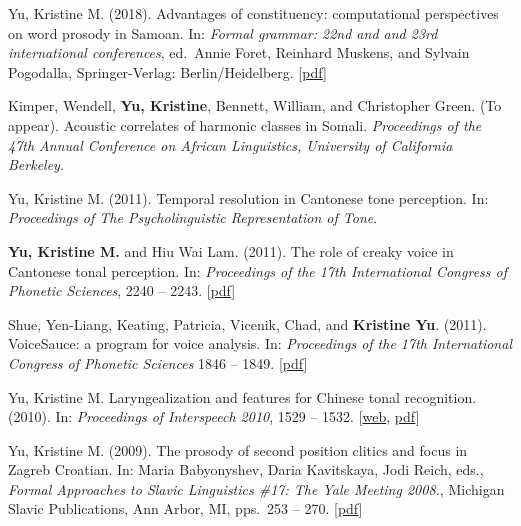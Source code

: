 \documentclass[10pt]{article}
\begin{document}
\begin{bibenum}
  
\item Yu, Kristine M. (2018). Advantages of constituency: computational perspectives on word prosody in Samoan. In: \emph{Formal grammar: 22nd and and 23rd international conferences}, ed.\ Annie Foret, Reinhard Muskens, and Sylvain Pogodalla, Springer-Verlag: Berlin/Heidelberg. [\href{https://github.com/krismyu/smo-constituency-feet/blob/master/fg-kmyu.pdf}{pdf}]

  \item Kimper, Wendell, \textbf{Yu, Kristine}, Bennett, William, and Christopher Green. (To appear). Acoustic correlates of harmonic classes in
    Somali. \emph{Proceedings of the 47th Annual Conference on African Linguistics, University of California Berkeley}.
  
    \item Yu, Kristine M. (2011). Temporal resolution in {C}antonese tone
      perception. In: \emph{Proceedings of The Psycholinguistic Representation of Tone}.

    \item \textbf{Yu, Kristine M.} and Hiu Wai Lam. (2011). The role of creaky
      voice in {C}antonese tonal perception. In: \emph{Proceedings of the
        17th International Congress of Phonetic Sciences},
      2240 -- 2243. [\href{http://www.krisyu.org/pages/pdfs/yu-lam2011-icphs-cantonese-creak.pdf}{pdf}] 

    \item Shue, Yen-Liang, Keating, Patricia, Vicenik, Chad, and \textbf{Kristine
      Yu}. (2011). VoiceSauce: a program for voice analysis. In:
      \emph{Proceedings of the 17th International Congress of Phonetic
        Sciences}
      1846 -- 1849. [\href{http://www.krisyu.org/pages/pdfs/shueETAL2011-icphsxvii-voicesauce.pdf}{pdf}]

    \item Yu, Kristine M. Laryngealization and features for Chinese
      tonal recognition. (2010). In: \emph{Proceedings of Interspeech 2010},
      1529 --
      1532. [\href{http://www.isca-speech.org/archive/interspeech_2010/i10_1529.html}{web}, \href{http://www.krisyu.org/pages/pdfs/yu2010-interspeech-laryngealization.pdf}{pdf}]

    \item Yu, Kristine M. (2009). The prosody of second position
      clitics and focus in Zagreb Croatian. In: Maria Babyonyshev,
      Daria Kavitskaya, Jodi Reich, eds., \emph{Formal Approaches to Slavic Linguistics \#17: 
The Yale Meeting 2008.}, Michigan Slavic Publications, Ann Arbor, MI,
pps.\ 253 -- 270. [\href{http://www.krisyu.org/pages/pdfs/yu2009-fasl17-croatian-2pc.pdf}{pdf}]  

\end{bibenum}
\end{document}

